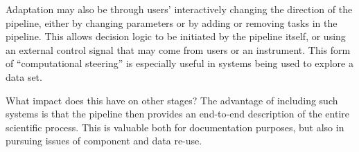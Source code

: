 Adaptation may also be through users' interactively changing the
direction of the pipeline, either by changing parameters or by
adding or removing tasks in the pipeline. This allows decision logic
to be initiated by the pipeline itself, or using an external
control signal that may come from users or an instrument. This form of
``computational steering'' is especially useful in systems being used
to explore a data set.

What impact does this have on other stages? The advantage of including
such systems is that the pipeline then provides an end-to-end
description of the entire scientific process. This is valuable both
for documentation purposes, but also in pursuing issues of component
and data re-use.





